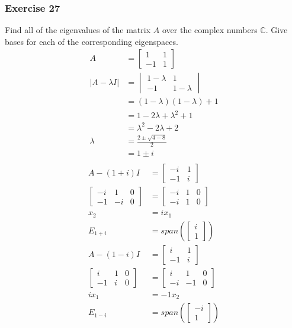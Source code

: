 \documentclass{math}
\begin{document}
\subsubsection*{Exercise 27}
Find all of the eigenvalues of the matrix \( A \) over the complex numbers
\( \mathbb{C} \). Give bases for each of the corresponding eigenspaces.
\begin{align*}
  A &= \begin{bmatrix}1 & 1 \\ -1 & 1\end{bmatrix} \\
  |A-\lambda I| &= \begin{vmatrix}
    1-\lambda & 1 \\
    -1 & 1-\lambda
  \end{vmatrix} \\
  &= (1-\lambda)(1-\lambda)+1 \\
  &= 1-2\lambda+\lambda^2+1 \\
  &= \lambda^2-2\lambda+2 \\
  \lambda &= \frac{2\pm\sqrt{4-8}}{2} \\
  &= 1\pm i \\
\end{align*}
\begin{align*}
  A-(1+i)I &= \begin{bmatrix} -i & 1 \\ -1 & i \end{bmatrix} \\
  \left[\begin{array}{cc|c}
    -i & 1 & 0 \\
    -1 & -i & 0
  \end{array}\right] &= \begin{bmatrix}
    -i & 1 & 0 \\
    -i & 1 & 0
  \end{bmatrix} \\
  x_2 &= ix_1 \\
  E_{1+i} &= span\left(\begin{bmatrix}i \\ 1\end{bmatrix}\right) \\
  A-(1-i)I &= \begin{bmatrix} i & 1 \\ -1 & i \end{bmatrix} \\
  \left[\begin{array}{cc|c}
    i & 1 & 0 \\
    -1 & i & 0
  \end{array}\right] &= \begin{bmatrix}
    i & 1 & 0 \\
    -i & -1 & 0
  \end{bmatrix} \\
  ix_1 &= -1x_2 \\
  E_{1-i} &= span\left(\begin{bmatrix}-i \\ 1\end{bmatrix}\right)
\end{align*}
\end{document}
